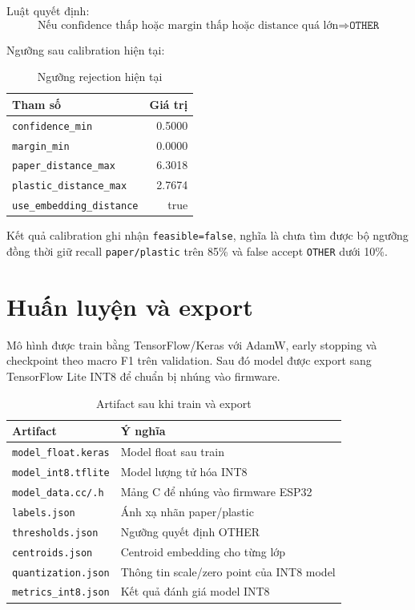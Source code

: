 \documentclass[12pt,a4paper]{article}
\begin{document}
Luật quyết định:
\[
\text{Nếu confidence thấp hoặc margin thấp hoặc distance quá lớn}
\Rightarrow \texttt{OTHER}
\]

Ngưỡng sau calibration hiện tại:

\begin{table}[H]
\centering
\caption{Ngưỡng rejection hiện tại}
\begin{tabular}{lr}
\toprule
\textbf{Tham số} & \textbf{Giá trị} \\
\midrule
\texttt{confidence\_min} & 0.5000 \\
\texttt{margin\_min} & 0.0000 \\
\texttt{paper\_distance\_max} & 6.3018 \\
\texttt{plastic\_distance\_max} & 2.7674 \\
\texttt{use\_embedding\_distance} & true \\
\bottomrule
\end{tabular}
\end{table}

Kết quả calibration ghi nhận \texttt{feasible=false}, nghĩa là chưa tìm được bộ
ngưỡng đồng thời giữ recall \texttt{paper/plastic} trên 85\% và false accept
\texttt{OTHER} dưới 10\%.

\section{Huấn luyện và export}
Mô hình được train bằng TensorFlow/Keras với AdamW, early stopping và checkpoint
theo macro F1 trên validation. Sau đó model được export sang TensorFlow Lite
INT8 để chuẩn bị nhúng vào firmware.

\begin{table}[H]
\centering
\caption{Artifact sau khi train và export}
\begin{tabular}{ll}
\toprule
\textbf{Artifact} & \textbf{Ý nghĩa} \\
\midrule
\texttt{model\_float.keras} & Model float sau train \\
\texttt{model\_int8.tflite} & Model lượng tử hóa INT8 \\
\texttt{model\_data.cc/.h} & Mảng C để nhúng vào firmware ESP32 \\
\texttt{labels.json} & Ánh xạ nhãn paper/plastic \\
\texttt{thresholds.json} & Ngưỡng quyết định OTHER \\
\texttt{centroids.json} & Centroid embedding cho từng lớp \\
\texttt{quantization.json} & Thông tin scale/zero point của INT8 model \\
\texttt{metrics\_int8.json} & Kết quả đánh giá model INT8 \\
\bottomrule
\end{tabular}
\end{table}
\end{document}
